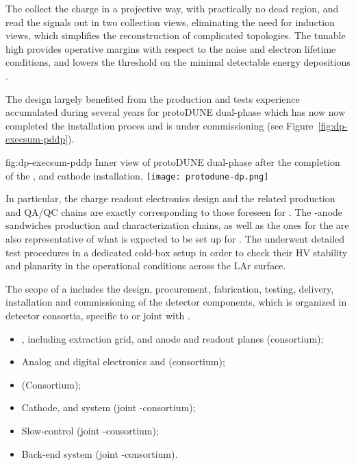 The  collect the charge in a projective way,  with practically no dead region, and read the signals out  in two collection views, eliminating the need for  induction views,  which  simplifies the reconstruction of complicated topologies. The tunable high  provides operative margins with respect to the noise and electron lifetime conditions, and lowers the threshold on the minimal  detectable energy depositions .

The  design largely benefited from the production and tests experience accumulated during several years for protoDUNE dual-phase which has now now completed the installation proces and is under commissioning (see Figure~\ref{fig:dp-execsum-pddp}). 

\begin{dunefigure}{fig:dp-execsum-pddp}
  {Inner view of protoDUNE dual-phase after the completion of the ,  and cathode installation.}
  \texttt{[image: protodune-dp.png]}
\end{dunefigure}

In particular, the charge readout electronics design and the related production and QA/QC chains are exactly corresponding to those foreseen for  . The -anode sandwiches production and characterization chains, as well as the ones for the    are also representative of what is expected to be set up for  . The  underwent detailed test procedures in a dedicated cold-box setup in order to check their HV stability and planarity in the operational conditions across the LAr surface.

The scope of a  includes the design, procurement, fabrication, testing, delivery, installation and commissioning of the detector components, which is organized in detector consortia, specific to \dual or joint with \single. 

\begin{itemize}
\item {}, including extraction grid,  and anode and readout planes (\dual consortium);
\item Analog and digital electronics and  (\dual consortium); 
\item {} (\dual Consortium);
\item Cathode,  and  system (joint \single{}-\dual consortium);  
\item Slow-control (joint \single{}-\dual consortium); 
\item Back-end  system (joint \single{}-\dual consortium).
\end{itemize}


